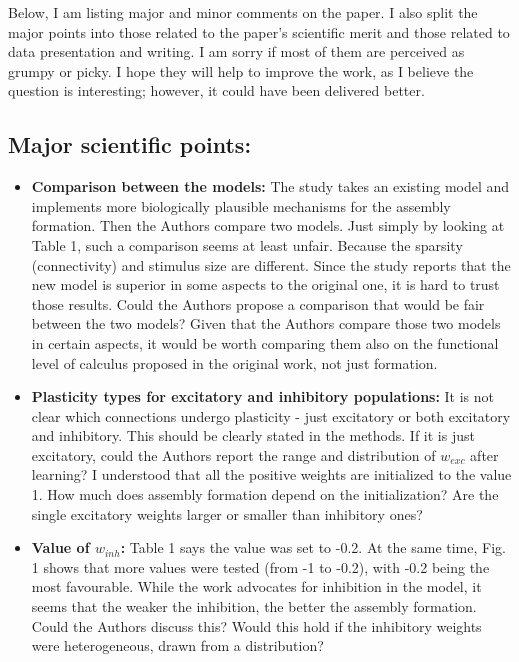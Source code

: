 \documentclass[a4paper, 11pt]{article}
\begin{document}
Below, I am listing major and minor comments on the paper. I also split the major points into those related to the paper's scientific merit and those related to data presentation and writing. I am sorry if most of them are perceived as grumpy or picky. I hope they will help to improve the work, as I believe the question is interesting; however, it could have been delivered better.

\subsection*{Major scientific points:}
\begin{itemize}
    \item \textbf{Comparison between the models:} The study takes an existing model and implements more biologically plausible mechanisms for the assembly formation. Then the Authors compare two models. Just simply by looking at Table 1, such a comparison seems at least unfair. Because the sparsity (connectivity) and stimulus size are different. Since the study reports that the new model is superior in some aspects to the original one, it is hard to trust those results. Could the Authors propose a comparison that would be fair between the two models? Given that the Authors compare those two models in certain aspects, it would be worth comparing them also on the functional level of calculus proposed in the original work, not just formation.
    
    \item \textbf{Plasticity types for excitatory and inhibitory populations:} It is not clear which connections undergo plasticity - just excitatory or both excitatory and inhibitory. This should be clearly stated in the methods. If it is just excitatory, could the Authors report the range and distribution of $w_{exc}$ after learning? I understood that all the positive weights are initialized to the value 1. How much does assembly formation depend on the initialization? Are the single excitatory weights larger or smaller than inhibitory ones?
    
    \item \textbf{Value of $w_{inh}$:} Table 1 says the value was set to -0.2. At the same time, Fig. 1 shows that more values were tested (from -1 to -0.2), with -0.2 being the most favourable. While the work advocates for inhibition in the model, it seems that the weaker the inhibition, the better the assembly formation. Could the Authors discuss this? Would this hold if the inhibitory weights were heterogeneous, drawn from a distribution?
    

\end{itemize}
\end{document}
